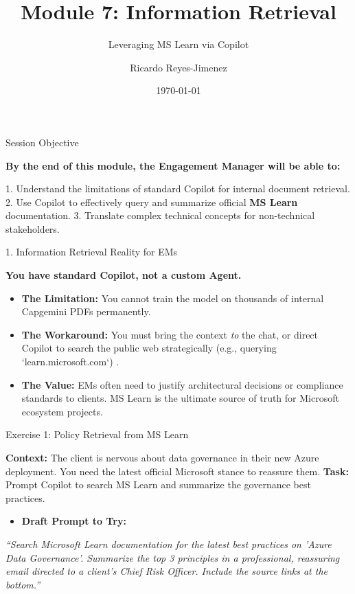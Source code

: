 \documentclass[aspectratio=169]{beamer}
\title[Module 7: Information Retrieva]{Module 7: Information Retrieval}
\subtitle{Leveraging MS Learn via Copilot}
\author{Ricardo Reyes-Jimenez}
\institute{Capgemini}
\date{\today}
\begin{document}
\begin{frame}
  \titlepage
\end{frame}

\usebackgroundtemplate{}



\begin{frame}[fragile]{Session Objective}


\textbf{By the end of this module, the Engagement Manager will be able to:}

1. Understand the limitations of standard Copilot for internal document retrieval.
2. Use Copilot to effectively query and summarize official \textbf{MS Learn} documentation.
3. Translate complex technical concepts for non-technical stakeholders.

\end{frame}



\begin{frame}[fragile]{1. Information Retrieval Reality for EMs}


\textbf{You have standard Copilot, not a custom Agent.}

\begin{itemize}
  \item \textbf{The Limitation:} You cannot train the model on thousands of internal Capgemini PDFs permanently.
  \item \textbf{The Workaround:} You must bring the context \textit{to} the chat, or direct Copilot to search the public web strategically (e.g., querying `learn.microsoft.com`) \cite{copilot2025}.
  \item \textbf{The Value:} EMs often need to justify architectural decisions or compliance standards to clients. MS Learn is the ultimate source of truth for Microsoft ecosystem projects.
\end{itemize}
\end{frame}



\begin{frame}[fragile]{Exercise 1: Policy Retrieval from MS Learn}


\textbf{Context:} The client is nervous about data governance in their new Azure deployment. You need the latest official Microsoft stance to reassure them.
\textbf{Task:} Prompt Copilot to search MS Learn and summarize the governance best practices.

\begin{itemize}
  \item \textbf{Draft Prompt to Try:}
\end{itemize}
\textit{``Search Microsoft Learn documentation for the latest best practices on 'Azure Data Governance'. Summarize the top 3 principles in a professional, reassuring email directed to a client's Chief Risk Officer. Include the source links at the bottom.''}

\end{frame}
\end{document}
